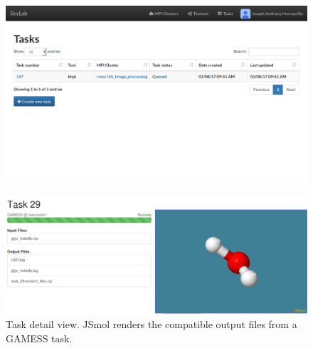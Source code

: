 \begin{figure}			
	\includegraphics[scale=0.93]{./images/n_tasks_printed.png}			
\end{figure}	

\begin{figure}			
	\includegraphics[scale=0.35]{./images/jsmol_detail_view_2.png}			
	\caption{\label{fig:jsmol}Task detail view.  JSmol \cite{IJCH:IJCH201300024} renders the compatible output files from a GAMESS task.}			
\end{figure}	
	
	
